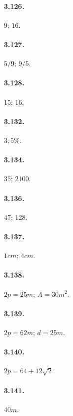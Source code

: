 \begin{multicols}{3}
\paragraph{3.126.}$ 9;\, 16 $.

\paragraph{3.127.}$ 5/9;\, 9/5 $.

\paragraph{3.128.}$ 15;\, 16 $,

\paragraph{3.132.}$ 3,5\% $.

\paragraph{3.134.}$ 35;\, 2100 $.

\paragraph{3.136.}$ 47;\, 128 $.

\paragraph{3.137.}$ 1\unit{cm};\, 4\unit{cm} $.

\paragraph{3.138.}$ 2p=25\unit{m};\, A=30\unit{m^2} $.

\paragraph{3.139.}$ 2p=62\unit{m};\, d=25\unit{m} $.

\paragraph{3.140.}$ 2p = 64 + 12 \sqrt{2} $.

\paragraph{3.141.}$ 40\unit{m} $.


\end{multicols}
